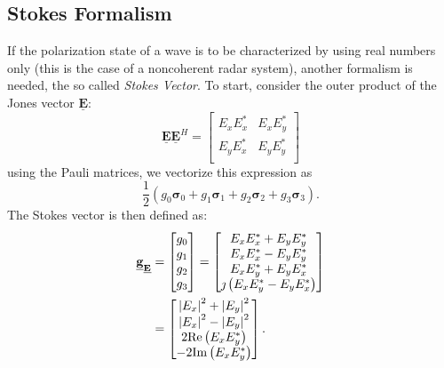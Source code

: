 \documentclass[11pt]{article}
\begin{document}
\subsection{Stokes Formalism}
If the polarization state of a wave is to be characterized by using real numbers only (this is the case of a noncoherent radar system), another formalism is needed, the so called \emph{Stokes Vector}.
To start, consider the outer product of the Jones vector $\mathbf{\underline{E}}$: 
\begin{equation}
	\mathbf{\underline{E}} \mathbf{\underline{E}}^{H} = 
	\begin{bmatrix}
		E_{x} E_{x}^{*} & E_{x} E_{y}^{*} \\
		E_{y} E_{x}^{*} & E_{y} E_{y}^{*} \\
	\end{bmatrix}
\end{equation}
using the Pauli matrices, we vectorize this expression as
\begin{equation}
	\frac{1}{2}\left(g_{0}\boldsymbol\sigma_{0}+g_{1}\boldsymbol\sigma_{1}+g_{2}\boldsymbol\sigma_{2}+
	g_{3}\boldsymbol\sigma_{3}
	\right).
\end{equation}
The Stokes vector is then defined as:
\begin{equation}
	\begin{split}
		\mathbf{\underline{g}}_{\mathbf{\underline{E}}} &= \begin{bmatrix}g_{0}\\g_{1}\\g_{2}\\g_{3}\end{bmatrix}
		=
		\begin{bmatrix}
		E_{x} E_{x}^{*} + E_{y} E_{y}^{*} \\
		E_{x} E_{x}^{*} - E_{y} E_{y}^{*} \\
		E_{x} E_{y}^{*} + E_{y} E_{x}^{*} \\
		\jmath\left(E_{x} E_{y}^{*} - E_{y} E_{x}^{*}\right) \\
		\end{bmatrix}\\
		&=
		\begin{bmatrix}
			\left|E_{x}\right|^{2} + \left|E_{y}\right|^{2}\\
			\left|E_{x}\right|^{2} - \left|E_{y}\right|^{2}\\
			2\mathrm{Re}\left(E_{x}E_{y}^{*}\right)\\
			-2\mathrm{Im}\left(E_{x}E_{y}^{*}\right)
		\end{bmatrix}.
	\end{split}
\end{equation}
\end{document}
